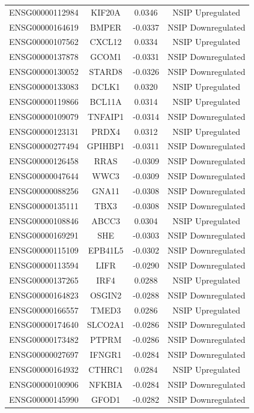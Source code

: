 \documentclass[
]{article}
\begin{document}
\begin{singlespace}
\begin{longtable}[t]{lccc}
\addlinespace
ENSG00000112984 & KIF20A & 0.0346 & NSIP Upregulated\\
ENSG00000164619 & BMPER & -0.0337 & NSIP Downregulated\\
ENSG00000107562 & CXCL12 & 0.0334 & NSIP Upregulated\\
ENSG00000137878 & GCOM1 & -0.0331 & NSIP Downregulated\\
ENSG00000130052 & STARD8 & -0.0326 & NSIP Downregulated\\
\addlinespace
ENSG00000133083 & DCLK1 & 0.0320 & NSIP Upregulated\\
ENSG00000119866 & BCL11A & 0.0314 & NSIP Upregulated\\
ENSG00000109079 & TNFAIP1 & -0.0314 & NSIP Downregulated\\
ENSG00000123131 & PRDX4 & 0.0312 & NSIP Upregulated\\
ENSG00000277494 & GPIHBP1 & -0.0311 & NSIP Downregulated\\
\addlinespace
ENSG00000126458 & RRAS & -0.0309 & NSIP Downregulated\\
ENSG00000047644 & WWC3 & -0.0309 & NSIP Downregulated\\
ENSG00000088256 & GNA11 & -0.0308 & NSIP Downregulated\\
ENSG00000135111 & TBX3 & -0.0308 & NSIP Downregulated\\
ENSG00000108846 & ABCC3 & 0.0304 & NSIP Upregulated\\
\addlinespace
ENSG00000169291 & SHE & -0.0303 & NSIP Downregulated\\
ENSG00000115109 & EPB41L5 & -0.0302 & NSIP Downregulated\\
ENSG00000113594 & LIFR & -0.0290 & NSIP Downregulated\\
ENSG00000137265 & IRF4 & 0.0288 & NSIP Upregulated\\
ENSG00000164823 & OSGIN2 & -0.0288 & NSIP Downregulated\\
\addlinespace
ENSG00000166557 & TMED3 & 0.0286 & NSIP Upregulated\\
ENSG00000174640 & SLCO2A1 & -0.0286 & NSIP Downregulated\\
ENSG00000173482 & PTPRM & -0.0286 & NSIP Downregulated\\
ENSG00000027697 & IFNGR1 & -0.0284 & NSIP Downregulated\\
ENSG00000164932 & CTHRC1 & 0.0284 & NSIP Upregulated\\
\addlinespace
ENSG00000100906 & NFKBIA & -0.0284 & NSIP Downregulated\\
ENSG00000145990 & GFOD1 & -0.0282 & NSIP Downregulated\\

\end{longtable}
\end{singlespace}
\end{document}
